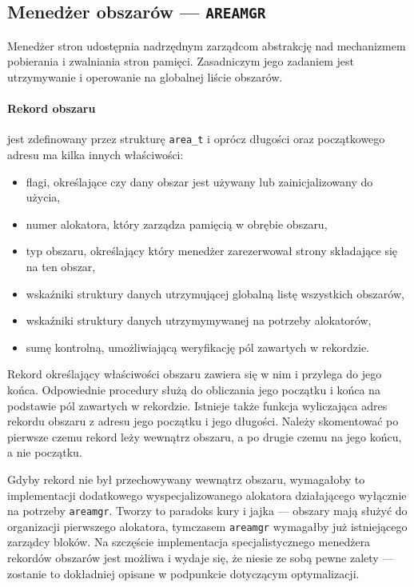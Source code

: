 \documentclass[12pt,a4paper,titlepage,twoside]{mwart}
\begin{document}
\newpage

\subsection{Menedżer obszarów --- \texttt{AREAMGR}}

Menedżer stron udostępnia nadrzędnym zarządcom abstrakcję nad mechanizmem
pobierania i zwalniania stron pamięci. Zasadniczym jego zadaniem jest
utrzymywanie i operowanie na globalnej liście obszarów. 

\paragraph{Rekord obszaru} jest zdefinowany przez strukturę \verb+area_t+ i
oprócz długości oraz początkowego adresu ma kilka innych właściwości:
\begin{itemize}
\item flagi, określające czy dany obszar jest używany lub zainicjalizowany do
użycia,
\item numer alokatora, który zarządza pamięcią w obrębie obszaru,
\item typ obszaru, określający który menedżer zarezerwował strony
składające się na ten obszar,
\item wskaźniki struktury danych utrzymującej globalną listę wszystkich obszarów,
\item wskaźniki struktury danych utrzymymywanej na potrzeby alokatorów,
\item sumę kontrolną, umożliwiającą weryfikację pól zawartych w rekordzie.
\end{itemize}

Rekord określający właściwości obszaru zawiera się w nim i przylega do jego
końca. Odpowiednie procedury służą do obliczania jego początku i końca na
podstawie pól zawartych w rekordzie. Istnieje także funkcja wyliczająca adres
rekordu obszaru z adresu jego początku i jego długości. Należy skomentować po
pierwsze czemu rekord leży wewnątrz obszaru, a po drugie czemu na jego końcu, a
nie początku.

Gdyby rekord nie był przechowywany wewnątrz obszaru, wymagałoby to
implementacji dodatkowego wyspecjalizowanego alokatora działającego wyłącznie
na potrzeby \texttt{areamgr}. Tworzy to paradoks kury i jajka --- obszary mają
służyć do organizacji pierwszego alokatora, tymczasem \texttt{areamgr}
wymagałby już istniejącego zarządcy bloków. Na szczęście implementacja
specjalistycznego menedżera rekordów obszarów jest możliwa i wydaje się, że
niesie ze sobą pewne zalety --- zostanie to dokładniej opisane w podpunkcie
dotyczącym optymalizacji. 
\end{document}
